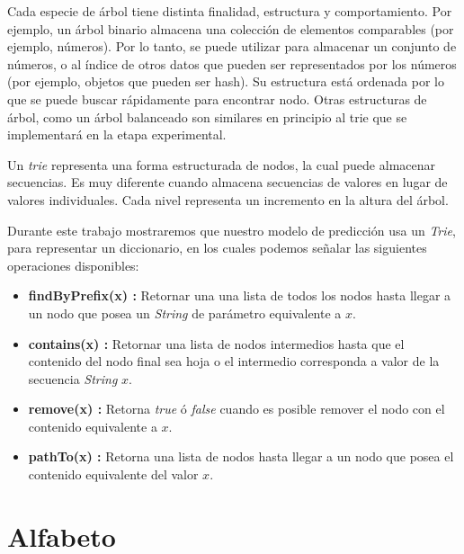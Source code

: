 Cada especie de árbol tiene distinta finalidad, estructura y comportamiento. Por ejemplo, un árbol binario almacena una colección de elementos comparables (por ejemplo, números). Por lo tanto, se puede utilizar para almacenar un conjunto de números, o al índice de otros datos que pueden ser representados por los números (por ejemplo, objetos que pueden ser hash). Su estructura está ordenada por lo que se puede buscar rápidamente para encontrar nodo. Otras estructuras de árbol, como un árbol balanceado son similares en principio al trie que se implementará en la etapa experimental.

Un \emph{trie} representa una forma  estructurada de nodos, la cual puede almacenar secuencias. %
Es muy diferente cuando almacena secuencias de valores en lugar de valores individuales. Cada nivel representa un incremento en la altura del árbol.


Durante este trabajo mostraremos que nuestro modelo de predicción usa un \emph{Trie}, para representar un diccionario, en los cuales podemos señalar las siguientes operaciones disponibles:

	\begin{itemize}
	
		\item \textbf{findByPrefix(x) :}  Retornar una una lista de todos los nodos hasta llegar a un nodo que posea un \emph{String} de parámetro equivalente a $x$.
		
		\item \textbf{contains(x) :} Retornar una lista de nodos intermedios hasta que el contenido del nodo final sea hoja o el intermedio corresponda a valor de la secuencia \emph{String} $x$.
		
		\item \textbf{remove(x) :} Retorna \emph{true} ó \emph{false} cuando es posible remover el nodo con el contenido equivalente a $x$.
		
		\item \textbf{pathTo(x) :} Retorna una lista de nodos hasta llegar a un nodo que posea el contenido equivalente del valor $x$.
		
	
	\end{itemize}







\section{Alfabeto}

